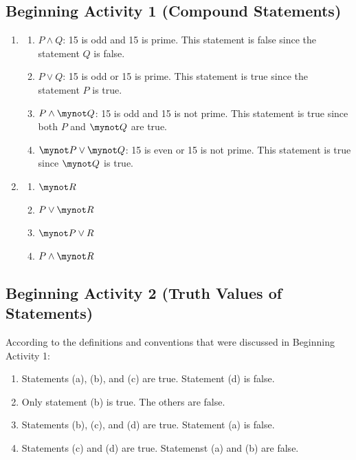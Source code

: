\documentclass[11pt]{article}
\begin{document}
\subsection*{Beginning Activity 1 (Compound Statements)}
\begin{enumerate}
  \item \begin{enumerate}
    \item $P \wedge Q$:  15 is odd and 15 is prime.  This statement is false since the statement $Q$ is false.
    \item $P \vee Q$:  15 is odd or 15 is prime.  This statement is true since the statement $P$ is true.
    \item $P \wedge \mynot Q$:  15 is odd and 15 is not prime.  This statement is true since both $P$ and $\mynot Q$ are true.
    \item $\mynot P \vee \mynot Q$:  15 is even or 15 is not prime.  This statement is true since $\mynot Q$ is true.
  \end{enumerate}


  \item \begin{multicols}{2} \begin{enumerate}
    \item $\mynot R$
    \item $P \vee \mynot R$
    \item $\mynot P \vee R$
    \item $P \wedge \mynot R$
  \end{enumerate} \end{multicols}
\end{enumerate}
\hbreak



\subsection*{Beginning Activity 2 (Truth Values of Statements)}

According to the definitions and conventions that were discussed in Beginning Activity 1:

\begin{enumerate}
\item Statements (a), (b), and (c) are true.  Statement (d) is false.

\item Only statement (b) is true.  The others are false.

\item Statements (b), (c), and (d) are true.  Statement (a) is false.

\item Statements (c) and (d) are true.  Statemenst (a) and (b) are false.
\end{enumerate}
\hbreak


%
\end{document}
